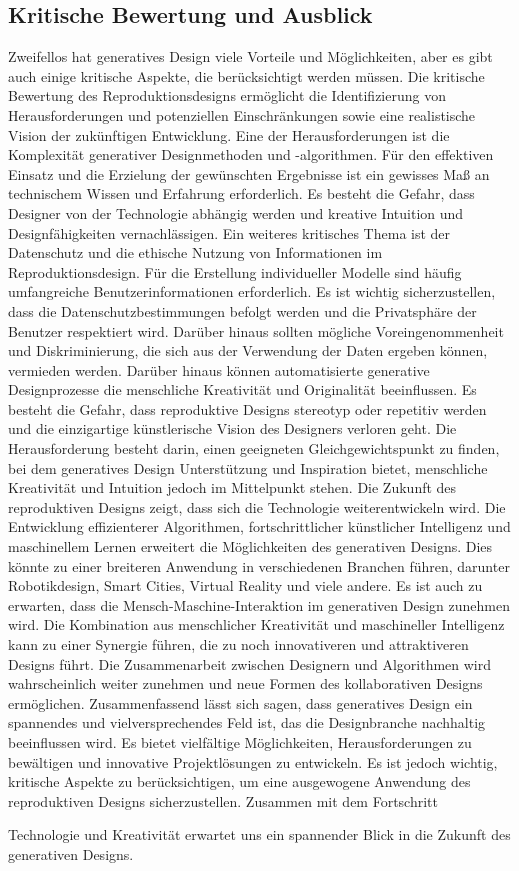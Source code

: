  \subsection*{Kritische Bewertung und Ausblick}

Zweifellos hat generatives Design  viele Vorteile und Möglichkeiten, aber es gibt auch einige kritische Aspekte, die berücksichtigt werden müssen. Die kritische Bewertung des Reproduktionsdesigns ermöglicht die Identifizierung von Herausforderungen und potenziellen Einschränkungen sowie eine realistische Vision der zukünftigen Entwicklung. 
 Eine der Herausforderungen ist die Komplexität generativer Designmethoden und -algorithmen. Für den effektiven Einsatz und die Erzielung der gewünschten Ergebnisse ist ein gewisses Maß an technischem Wissen und Erfahrung erforderlich. Es besteht die Gefahr, dass Designer von der Technologie abhängig werden und  kreative Intuition und Designfähigkeiten vernachlässigen.  Ein weiteres kritisches Thema ist der Datenschutz und die ethische Nutzung von Informationen im Reproduktionsdesign. Für die Erstellung individueller Modelle sind häufig umfangreiche Benutzerinformationen erforderlich. Es ist wichtig sicherzustellen, dass die Datenschutzbestimmungen befolgt werden und die Privatsphäre der Benutzer respektiert wird. Darüber hinaus sollten mögliche Voreingenommenheit und Diskriminierung, die sich aus der Verwendung der Daten ergeben können, vermieden werden. 
 Darüber hinaus können automatisierte generative Designprozesse die menschliche Kreativität und Originalität beeinflussen. Es besteht die Gefahr, dass reproduktive Designs stereotyp oder repetitiv werden und die einzigartige künstlerische Vision des Designers verloren geht. Die Herausforderung besteht darin, einen geeigneten Gleichgewichtspunkt zu finden, bei dem generatives Design  Unterstützung und Inspiration bietet, menschliche Kreativität und Intuition jedoch im Mittelpunkt stehen. 
 Die Zukunft des reproduktiven Designs zeigt, dass sich die Technologie weiterentwickeln wird. Die Entwicklung effizienterer Algorithmen, fortschrittlicher künstlicher Intelligenz und maschinellem Lernen erweitert die Möglichkeiten des generativen Designs. Dies könnte zu einer breiteren Anwendung in verschiedenen Branchen führen, darunter Robotikdesign, Smart Cities, Virtual Reality und viele andere. Es ist auch zu erwarten, dass die Mensch-Maschine-Interaktion im generativen Design zunehmen wird. Die Kombination aus menschlicher Kreativität und maschineller Intelligenz kann zu einer Synergie führen, die zu noch innovativeren und attraktiveren Designs führt. Die Zusammenarbeit zwischen Designern und Algorithmen wird wahrscheinlich weiter zunehmen und neue Formen des kollaborativen Designs ermöglichen. 
 Zusammenfassend lässt sich sagen, dass generatives Design ein spannendes und vielversprechendes Feld ist, das die Designbranche nachhaltig beeinflussen wird. Es bietet vielfältige Möglichkeiten, Herausforderungen zu bewältigen und innovative Projektlösungen zu entwickeln. Es ist jedoch wichtig, kritische Aspekte zu berücksichtigen, um eine ausgewogene Anwendung des reproduktiven Designs sicherzustellen. Zusammen mit dem Fortschritt 
 
  Technologie und Kreativität erwartet uns ein spannender Blick in die Zukunft des generativen Designs.